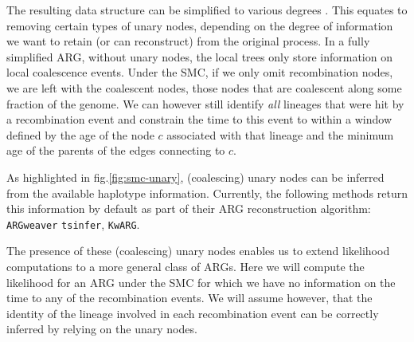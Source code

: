 \documentclass{article}
\newcommand{\tsinfer}[0]{\texttt{tsinfer}}
\newcommand{\kwarg}[0]{\texttt{KwARG}}
\newcommand{\argweaver}[0]{\texttt{ARGweaver}}
\begin{document}

The resulting data structure can be simplified to various degrees \citep{Wong-2023}. 
This equates to removing certain types of unary nodes, 
depending on the degree of information 
we want to retain (or can reconstruct) from the original process. 
In a fully simplified ARG, without unary nodes, 
the local trees only store information on local coalescence events.
Under the SMC, if we only omit recombination nodes, %
we are left with the coalescent nodes, those nodes that are coalescent 
along some fraction of the genome. We can however still identify \emph{all} 
lineages that were hit by a recombination event and constrain the time to 
this event to within a window defined by the age of the node $c$ associated with that 
lineage and the minimum age of the parents of the edges connecting to $c$.

As highlighted in fig.\ref{fig:smc-unary}, (coalescing) unary nodes can be inferred 
from the available haplotype information. Currently, the following methods 
return this information by default as part of their ARG reconstruction algorithm: 
\argweaver \citep{rasmussen_genome-wide_2014} 
\tsinfer \citep{kelleher_inferring_2019}, 
\kwarg \citep{ignatieva_kwarg_2021}.

The presence of these (coalescing) unary nodes enables us to extend likelihood 
computations to a more general class of ARGs.
Here we will compute the likelihood for an ARG
under the SMC for which we have no information on the time to any 
of the recombination events. 
We will assume however, that the identity 
of the lineage involved in each recombination event can be correctly 
inferred by relying on the unary nodes.
\end{document}
